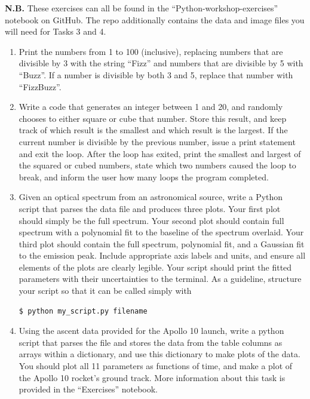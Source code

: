 \documentclass{tufte-book}
\begin{document}
\textbf{N.B.} These exercises can all be found in the ``Python-workshop-exercises'' notebook on GitHub. The repo additionally contains the data and image files you will need for Tasks 3 and 4.
\begin{tcolorbox}[sharp corners=all, colback=white!75!green]
\begin{enumerate}   
    \item 
        Print the numbers from 1 to 100 (inclusive), replacing numbers that are divisible by 3 with the string ``Fizz'' and numbers that are divisible by 5 with ``Buzz''. If a number is divisible by both 3 and 5, replace that number with ``FizzBuzz''. 
    \item 
        Write a code that generates an integer between 1 and 20, and randomly chooses to either square or cube that number. Store this result, and keep track of which result is the smallest and which result is the largest. If the current number is divisible by the previous number, issue a print statement and exit the loop. After the loop has exited, print the smallest and largest of the squared or cubed numbers, state which two numbers caused the loop to break, and inform the user how many loops the program completed.
    \item 
        Given an optical spectrum from an astronomical source, write a Python script that parses the data file and produces three plots. Your first plot should simply be the full spectrum. Your second plot should contain full spectrum with a polynomial fit to the baseline of the spectrum overlaid. Your third plot should contain the full spectrum, polynomial fit, and a Gaussian fit to the emission peak. Include appropriate axis labels and units, and ensure all elements of the plots are clearly legible. Your script should print the fitted parameters with their uncertainties to the terminal. As a guideline, structure your script so that it can be called simply with
    \begin{lstlisting}[language=Bash]
    $ python my_script.py filename
    \end{lstlisting}
    \item 
        Using the ascent data provided for the Apollo 10 launch, write a python script that parses the file and stores the data from the table columns as arrays within a dictionary, and use this dictionary to make plots of the data. You should plot all 11 parameters as functions of time, and make a plot of the Apollo 10 rocket's ground track. More information about this task is provided in the ``Exercises'' notebook.
\end{enumerate}

\end{tcolorbox} 
\end{document}
